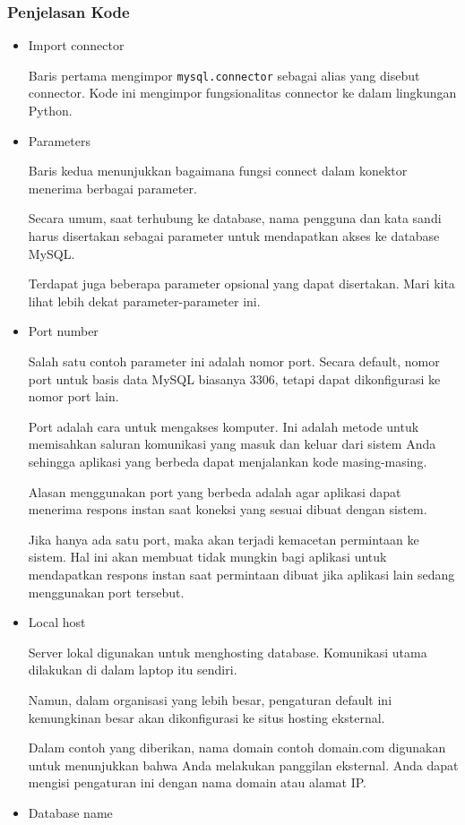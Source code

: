 \documentclass{article}
\begin{document}
\subsubsection{Penjelasan Kode}
\begin{itemize}
      \item Import connector

            Baris pertama mengimpor \verb|mysql.connector| sebagai alias yang disebut connector. Kode ini mengimpor fungsionalitas connector ke dalam lingkungan Python.
      \item Parameters

            Baris kedua menunjukkan bagaimana fungsi connect dalam konektor menerima berbagai parameter.

            Secara umum, saat terhubung ke database, nama pengguna dan kata sandi harus disertakan sebagai parameter untuk mendapatkan akses ke database MySQL.

            Terdapat juga beberapa parameter opsional yang dapat disertakan. Mari kita lihat lebih dekat parameter-parameter ini.
      \item Port number

            Salah satu contoh parameter ini adalah nomor port. Secara default, nomor port untuk basis data MySQL biasanya 3306, tetapi dapat dikonfigurasi ke nomor port lain.

            Port adalah cara untuk mengakses komputer. Ini adalah metode untuk memisahkan saluran komunikasi yang masuk dan keluar dari sistem Anda sehingga aplikasi yang berbeda dapat menjalankan kode masing-masing.

            Alasan menggunakan port yang berbeda adalah agar aplikasi dapat menerima respons instan saat koneksi yang sesuai dibuat dengan sistem.

            Jika hanya ada satu port, maka akan terjadi kemacetan permintaan ke sistem. Hal ini akan membuat tidak mungkin bagi aplikasi untuk mendapatkan respons instan saat permintaan dibuat jika aplikasi lain sedang menggunakan port tersebut.
      \item Local host


            Server lokal digunakan untuk menghosting database. Komunikasi utama dilakukan di dalam laptop itu sendiri.

            Namun, dalam organisasi yang lebih besar, pengaturan default ini kemungkinan besar akan dikonfigurasi ke situs hosting eksternal.

            Dalam contoh yang diberikan, nama domain contoh domain.com digunakan untuk menunjukkan bahwa Anda melakukan panggilan eksternal. Anda dapat mengisi pengaturan ini dengan nama domain atau alamat IP.
      \item Database name


\end{itemize}
\end{document}

